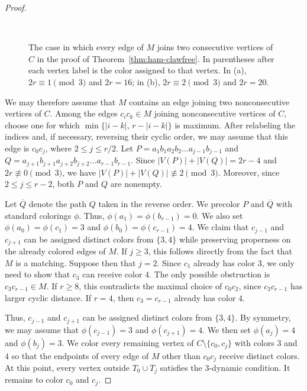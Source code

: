 \documentclass[a4paper,11pt]{article}
\theoremstyle{case}
\numberwithin{subcase}{case}
\begin{document}
\begin{proof}
\begin{figure}[H]
\begin{subfigure}{0.48\textwidth}
        \caption{$ $}
    \end{subfigure}

  \caption{The case in which every edge of $M$ joins two consecutive
vertices of $C$ in the proof of Theorem~\ref{thm:ham-clawfree}.
In parentheses after each vertex label is the color assigned to that
vertex. In (a), $2r\equiv1\pmod3$ and $2r=16$; in (b),
$2r\equiv2\pmod3$ and $2r=20$.}
    \label{fig:cubic-consecutive}
\end{figure}

We may therefore assume that $M$ contains an edge joining two
nonconsecutive vertices of $C$.
Among the edges $c_ic_k\in M$ joining nonconsecutive vertices of $C$,
choose one for which
$
\min\{|i-k|,\,r-|i-k|\}
$
is maximum. After relabeling the indices and, if necessary, reversing
their cyclic order, we may assume that this edge is $c_0c_j$, where
$
2\leq j\leq r/2.
$
Let
$
P=a_1b_1a_2b_2\ldots a_{j-1}b_{j-1}
$
and
$
Q=a_{j+1}b_{j+1}a_{j+2}b_{j+2}\ldots
a_{r-1}b_{r-1}.
$
Since
$
|V(P)|+|V(Q)|=2r-4
$
and $2r\not\equiv0\pmod3$, we have
$
|V(P)|+|V(Q)|\not\equiv2\pmod3.
$
Moreover, since $2\leq j\leq r-2$, both $P$ and $Q$ are nonempty.

Let $\overline{Q}$ denote the path $Q$ taken in the reverse order.
We precolor $P$ and $\overline{Q}$ with standard colorings $\phi$.
Thus, $\phi(a_1)=\phi(b_{r-1})=0$. We also set
$\phi(a_0)=\phi(c_1)=3$ and
$\phi(b_0)=\phi(c_{r-1})=4$.
We claim that $c_{j-1}$ and $c_{j+1}$ can be assigned distinct colors
from $\{3,4\}$ while preserving properness on the already colored edges
of $M$. If $j\geq3$, this follows directly from the fact that $M$ is a
matching. Suppose then that $j=2$. Since $c_1$ already has color $3$, we only
need to show that $c_3$ can receive color $4$. The only possible
obstruction is $c_3c_{r-1}\in M$. If $r\geq8$, this contradicts the
maximal choice of $c_0c_2$, since $c_3c_{r-1}$ has larger cyclic
distance. If $r=4$, then $c_3=c_{r-1}$ already has color $4$.

Thus, $c_{j-1}$ and $c_{j+1}$ can be assigned distinct colors from
$\{3,4\}$. By symmetry, we may assume that
$\phi(c_{j-1})=3$ and $\phi(c_{j+1})=4$. We then set
$\phi(a_j)=4$ and $\phi(b_j)=3$.
We color every remaining vertex of
$C\setminus\{c_0,c_j\}$ with colors $3$ and $4$ so that the endpoints
of every edge of $M$ other than $c_0c_j$ receive distinct colors.
At this point, every vertex outside $T_0\cup T_j$ satisfies the
$3$-dynamic condition. It remains to color $c_0$ and $c_j$.


\end{proof}
\end{document}
